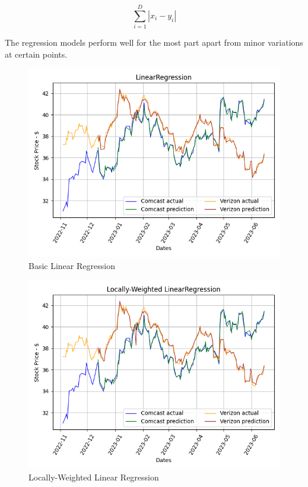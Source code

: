 \documentclass[conference]{IEEEtran}
\begin{document}
\begin{equation}
    \sum_{i=1}^{D}|x_i-y_i|
    \label{eq:mae}
\end{equation}

The regression models perform well for the most part apart from minor variations at certain points.

\begin{figure}[b]
    \includegraphics[width=\columnwidth]{LinearRegression}
    \caption{Basic Linear Regression}
    \label{fig:lr}
\end{figure}

\begin{figure}
    \includegraphics[width=\columnwidth]{Locally-Weighted LinearRegression}
    \caption{Locally-Weighted Linear Regression}
\end{figure}
\end{document}
